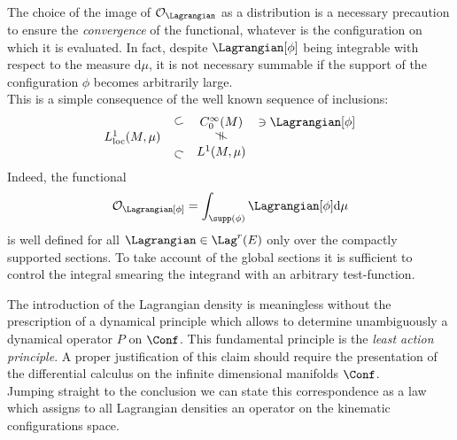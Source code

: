 \documentclass[Main]{subfiles}
\begin{document}
	\vspace{3mm}
		The choice of the image of $\mathcal{O}_\Lagrangian$ as a distribution is a necessary precaution to ensure the \emph{convergence} of the functional, whatever is the configuration on which it is evaluated.
		In fact, despite $\Lagrangian [ \phi ]$  being integrable with respect to the measure $\textrm{d}\mu$, it is not necessary summable if the support of the configuration $\phi$ becomes arbitrarily large.
		\\
		This is a simple consequence of the well known sequence of inclusions:
		\begin{displaymath}
			\begin{array}{cccl}
				&\rotatebox{20}{$\subset$}& C^\infty_0(M) & \ni \Lagrangian [ \phi ]  \\
				L^1_{\textrm{loc}}(M,\mu) & & \rotatebox{90}{$\neq$} & \\
				&\rotatebox{-20}{$\subset$}& L^1(M,\mu) & \\
			\end{array}
		\end{displaymath}
		Indeed, the functional
		\begin{displaymath}
			\mathcal{O}_\Lagrangian [\phi]= \int_{\supp(\phi)} \Lagrangian [\phi] \textrm{d}\mu
		\end{displaymath}
		is well defined for all $\Lagrangian \in \Lag^r(E)$ only over the compactly supported sections. 
		To take account of the global sections it is sufficient to control the integral smearing the integrand with an arbitrary test-function.
	

	\vspace{2mm}
	The introduction of the Lagrangian density is meaningless without the prescription of a dynamical principle which allows to determine unambiguously a dynamical operator $P$ on $\Conf$.
	This fundamental principle is the \emph{least action principle}.
	A proper justification of this claim should require the presentation of the differential calculus on the infinite dimensional manifolds $\Conf$. 
	\\
	Jumping straight to the conclusion we can state this correspondence as a law which assigns to all Lagrangian densities an operator on the kinematic configurations space. 
	
\end{document}
